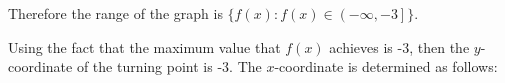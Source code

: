     
          
          \label{m39345*id244912}Therefore the range of the graph is \begin{math}\{f\left(x\right):f\left(x\right)\in \left(-\infty ,-3\right]\}\end{math}.\par 
          \label{m39345*id244967}Using the fact that the maximum value that \begin{math}f\left(x\right)\end{math} achieves is -3, then the \begin{math}y\end{math}-coordinate of the turning point is -3. The \begin{math}x\end{math}-coordinate is determined as follows:\par 
          \label{m39345*id245008}\nopagebreak\noindent{}
